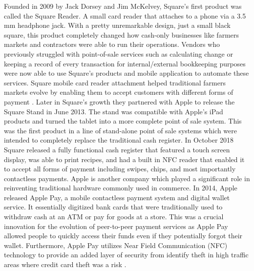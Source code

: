 \documentclass{article}
\begin{document}
Founded in 2009 by Jack Dorsey and Jim McKelvey, Square’s first product was called the Square Reader. A small card reader that attaches to a phone via a 3.5 mm headphone jack. With a pretty unremarkable design, just a small black square, this product completely changed how cash-only businesses like farmers markets and contractors were able to run their operations. Vendors who previously struggled with point-of-sale services such as calculating change or keeping a record of every transaction for internal/external bookkeeping purposes were now able to use Square’s products and mobile application to automate these services. Square mobile card reader attachment helped traditional farmers markets evolve by enabling them to accept customers with different forms of payment \cite{cussen_2020}. Later in Square's growth they partnered with Apple to release the Square Stand in June 2013. The stand was compatible with Apple's iPad products and turned the tablet into a more complete point of sale system. This was the first product in a line of stand-alone point of sale systems which were intended to completely replace the traditional cash register. In October 2018 Square released a fully functional cash register that featured a touch screen display, was able to print recipes, and had a built in NFC reader that enabled it to accept all forms of payment including swipes, chips, and most importantly contactless payments.
Apple is another company which played a significant role in reinventing traditional hardware commonly used in commerce. In 2014, Apple released Apple Pay, a mobile contactless payment system and digital wallet service. It essentially digitized bank cards that were traditionally used to withdraw cash at an ATM or pay for goods at a store. This was a crucial innovation for the evolution of peer-to-peer payment services as Apple Pay allowed people to quickly access their funds even if they potentially forgot their wallet. Furthermore, Apple Pay utilizes Near Field Communication (NFC) technology to provide an added layer of security from identify theft in high traffic areas where credit card theft was a risk \cite{larkin_2020}. 
\end{document}
